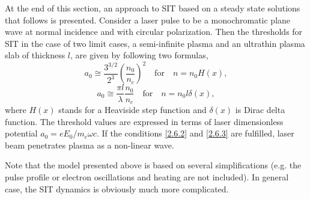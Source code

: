 At the end of this section, an approach to SIT based on a steady state solutions that follows \cite{Macchi2013} is presented. Consider a laser pulse to be a monochromatic plane wave at normal incidence and with circular polarization. Then the thresholds for SIT in the case of two limit cases, a semi-infinite plasma and an ultrathin plasma slab of thickness $ l $, are given by following two formulas,
\begin{equation}
\label{2.6.2}
a_0 \cong \frac{3^{3/2}}{2^3} \left( \frac{n_0}{n_c} \right)^2 \quad \mathrm{for} \quad n = n_0 H\left(x \right),
\end{equation}
\begin{equation}
\label{2.6.3}
a_0 \cong \frac{\pi l}{\lambda} \frac{n_0}{n_c} \quad \mathrm{for} \quad  n = n_0 l \delta\left(x \right),
\end{equation}
where $ H\left(x \right) $ stands for a Heaviside step function and $ \delta\left(x \right) $ is Dirac delta function. The threshold values are expressed in terms of laser dimensionless potential $ a_0 = e E_0/m_e \omega c $. If the conditions \ref{2.6.2} and \ref{2.6.3} are fulfilled, laser beam penetrates plasma as a non-linear wave.
 
Note that the model presented above is based on several simplifications (e.g. the pulse profile or electron oscillations and heating are not included). In general case, the SIT dynamics is obviously much more complicated.
